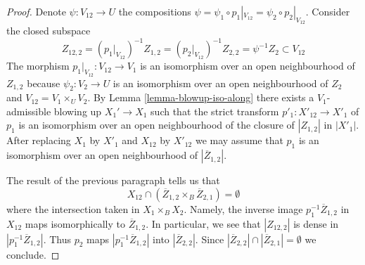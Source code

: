 \begin{proof}
\medskip\noindent
Denote $\psi : V_{12} \to U$ the compositions
$\psi = \psi_1 \circ p_1|_{V_{12}} = \psi_2 \circ p_2|_{V_{12}}$.
Consider the closed subspace
$$
Z_{12, 2} =
(p_1|_{V_{12}})^{-1}Z_{1, 2} =
(p_2|_{V_{12}})^{-1}Z_{2, 2} =
\psi^{-1}Z_2 \subset V_{12}
$$
The morphism $p_1|_{V_{12}} : V_{12} \to V_1$ is an isomorphism
over an open neighbourhood of $Z_{1, 2}$ because $\psi_2 : V_2 \to U$
is an isomorphism over an open neighbourhood of $Z_2$ and
$V_{12} = V_1 \times_U V_2$. By Lemma \ref{lemma-blowup-iso-along}
there exists a $V_1$-admissible blowing up $X_1' \to X_1$
such that the strict transform $p'_1 : X'_{12} \to X'_1$
of $p_1$ is an isomorphism over an open neighbourhood of
the closure of $|Z_{1, 2}|$ in $|X'_1|$.
After replacing $X_1$ by $X'_1$ and $X_{12}$ by $X'_{12}$
we may assume that $p_1$ is an isomorphism over an open
neighbourhood of $|\overline{Z}_{1, 2}|$.

\medskip\noindent
The result of the previous paragraph tells us that
$$
X_{12} \cap (\overline{Z}_{1, 2} \times_B \overline{Z}_{2, 1}) = \emptyset
$$
where the intersection taken in $X_1 \times_B X_2$. Namely, the inverse
image $p_1^{-1}\overline{Z}_{1, 2}$ in $X_{12}$ maps isomorphically
to $\overline{Z}_{1, 2}$. In particular, we see that $|Z_{12, 2}|$
is dense in $|p_1^{-1}\overline{Z}_{1, 2}|$. Thus $p_2$ maps
$|p_1^{-1}\overline{Z}_{1, 2}|$ into $|\overline{Z}_{2, 2}|$.
Since $|\overline{Z}_{2, 2}| \cap |\overline{Z}_{2, 1}| = \emptyset$
we conclude.


\end{proof}
